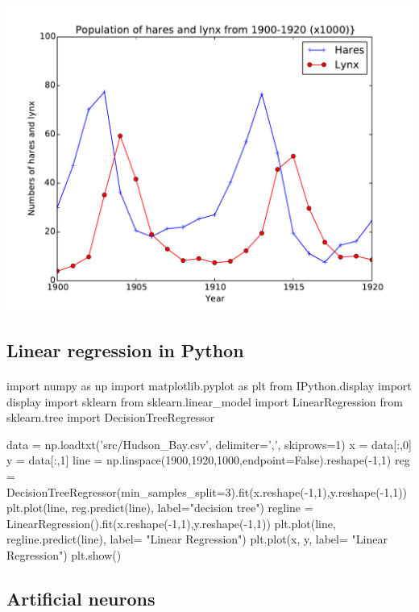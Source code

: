 \documentclass[%
oneside,                 %
final,                   %
10pt]{article}
\begin{document}
\centerline{\includegraphics[width=0.9\linewidth]{figures/Hudson_Bay_data.pdf}}

\vspace{6mm}




\subsection{Linear regression in Python}

\paragraph{}
\bpycod
import numpy as np
import matplotlib.pyplot as plt
from IPython.display import display
import sklearn
from sklearn.linear_model import LinearRegression
from sklearn.tree import DecisionTreeRegressor


data = np.loadtxt('src/Hudson_Bay.csv', delimiter=',', skiprows=1)
x = data[:,0]
y = data[:,1]
line = np.linspace(1900,1920,1000,endpoint=False).reshape(-1,1)
reg = DecisionTreeRegressor(min_samples_split=3).fit(x.reshape(-1,1),y.reshape(-1,1))
plt.plot(line, reg.predict(line), label="decision tree")
regline = LinearRegression().fit(x.reshape(-1,1),y.reshape(-1,1))
plt.plot(line, regline.predict(line), label= "Linear Regression")
plt.plot(x, y, label= "Linear Regression")
plt.show()
\epycod





\subsection{Artificial neurons}
\end{document}
